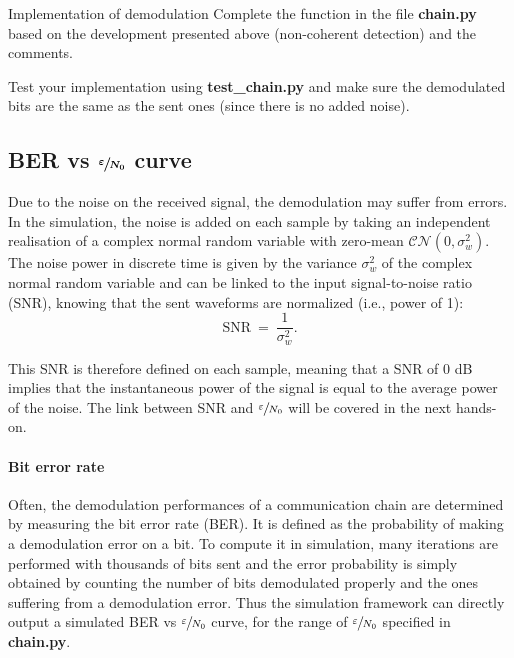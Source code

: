 \begin{bclogo}[couleur = gray!20, arrondi = 0.2, logo=\bccrayon]{Implementation of demodulation}
Complete the  function in the file \textbf{chain.py} based on the development presented above (non-coherent detection) and the comments.

Test your implementation using \textbf{test\_chain.py} and make sure the demodulated bits are the same as the sent ones (since there is no added noise).
\end{bclogo}

\subsection{BER vs $\boldsymbol{\sfrac{\varepsilon}{N_0}}$ curve}
Due to the noise on the received signal, the demodulation may suffer from errors. In the simulation, the noise is added on each sample by taking an independent realisation of a complex normal random variable with zero-mean $\mathcal{CN}(0,\sigma_w^2)$. The noise power in discrete time is given by the variance $\sigma_w^2$ of the complex normal random variable and can be linked to the input signal-to-noise ratio (SNR), knowing that the sent waveforms are normalized (i.e., power of 1):
\begin{equation*}
    \text{SNR}\:=\:\frac{1}{\sigma_w^2}.
\end{equation*}

This SNR is therefore defined on each sample, meaning that a SNR of 0 dB implies that the instantaneous power of the signal is equal to the average power of the noise. The link between SNR and $\sfrac{\varepsilon}{N_0}$ will be covered in the next hands-on.



\paragraph{Bit error rate}
Often, the demodulation performances of a communication chain are determined by measuring the bit error rate (BER). It is defined as the probability of making a demodulation error on a bit. To compute it in simulation, many iterations are performed with thousands of bits sent and the error probability is simply obtained by counting the number of bits demodulated properly and the ones suffering from a demodulation error. Thus the simulation framework can directly output a simulated BER vs $\sfrac{\varepsilon}{N_0}$ curve, for the range of $\sfrac{\varepsilon}{N_0}$ specified in \textbf{chain.py}.

